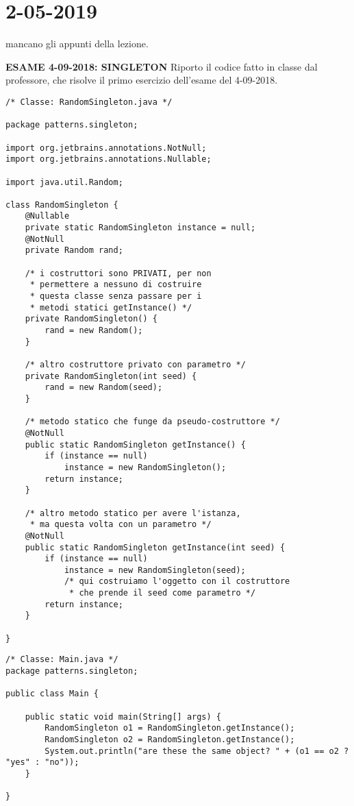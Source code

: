 

\newpage
\section{2-05-2019}
\noindent mancano gli appunti della lezione.


\noindent \textbf{ESAME 4-09-2018: SINGLETON} \newline
Riporto il codice fatto in classe dal professore, che risolve il primo esercizio dell'esame del 4-09-2018. \newline

\begin{lstlisting}
/* Classe: RandomSingleton.java */

package patterns.singleton;

import org.jetbrains.annotations.NotNull;
import org.jetbrains.annotations.Nullable;

import java.util.Random;

class RandomSingleton {
    @Nullable
    private static RandomSingleton instance = null;
    @NotNull
    private Random rand;

    /* i costruttori sono PRIVATI, per non
     * permettere a nessuno di costruire
     * questa classe senza passare per i 
     * metodi statici getInstance() */
    private RandomSingleton() {
        rand = new Random();
    }

    /* altro costruttore privato con parametro */
    private RandomSingleton(int seed) {
        rand = new Random(seed);
    }

    /* metodo statico che funge da pseudo-costruttore */
    @NotNull
    public static RandomSingleton getInstance() {
        if (instance == null)
            instance = new RandomSingleton();
        return instance;
    }

    /* altro metodo statico per avere l'istanza, 
     * ma questa volta con un parametro */
    @NotNull
    public static RandomSingleton getInstance(int seed) {
        if (instance == null)
            instance = new RandomSingleton(seed);   
            /* qui costruiamo l'oggetto con il costruttore
             * che prende il seed come parametro */
        return instance;
    }

}
\end{lstlisting}


\begin{lstlisting}
/* Classe: Main.java */
package patterns.singleton;

public class Main {

    public static void main(String[] args) {
        RandomSingleton o1 = RandomSingleton.getInstance();
        RandomSingleton o2 = RandomSingleton.getInstance();
        System.out.println("are these the same object? " + (o1 == o2 ? "yes" : "no"));
    }

}
\end{lstlisting}

